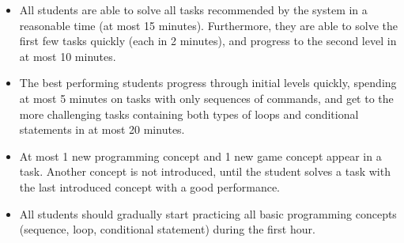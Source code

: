 \begin{itemize}
\item All students are able to solve all tasks recommended by the system
  in a reasonable time (at most 15 minutes).
  Furthermore, they are able to solve the first few tasks quickly
  (each in 2 minutes), and progress to the second level in at most 10 minutes.
\item The best performing students %
progress through initial levels quickly, spending at most 5 minutes
on tasks with only sequences of commands, and get to the more
challenging tasks containing both types of loops and conditional statements
in at most 20 minutes.  %
\item At most 1 new programming concept and 1 new game concept appear
  in a task. Another concept is not introduced, until the student
  solves a task with the last introduced concept with a good
  performance. %
\item All students should gradually start practicing all basic programming concepts
  (sequence, loop, conditional statement) during the first hour. %
\end{itemize}

